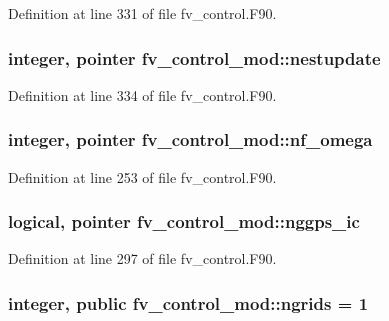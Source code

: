 Definition at line 331 of file fv\-\_\-control.\-F90.

\subsubsection[{nestupdate}]{\setlength{\rightskip}{0pt plus 5cm}integer, pointer fv\-\_\-control\-\_\-mod\-::nestupdate\hspace{0.3cm}{\ttfamily [private]}}\label{classfv__control__mod_aa2a2e8daf4ef4127a85ff187f6bdb44a}


Definition at line 334 of file fv\-\_\-control.\-F90.

\subsubsection[{nf\-\_\-omega}]{\setlength{\rightskip}{0pt plus 5cm}integer, pointer fv\-\_\-control\-\_\-mod\-::nf\-\_\-omega\hspace{0.3cm}{\ttfamily [private]}}\label{classfv__control__mod_af5caed647905a5044033d699efb9d678}


Definition at line 253 of file fv\-\_\-control.\-F90.

\subsubsection[{nggps\-\_\-ic}]{\setlength{\rightskip}{0pt plus 5cm}logical, pointer fv\-\_\-control\-\_\-mod\-::nggps\-\_\-ic\hspace{0.3cm}{\ttfamily [private]}}\label{classfv__control__mod_a6b8b8e887c41c9b275875bf1e24f17a4}


Definition at line 297 of file fv\-\_\-control.\-F90.

\subsubsection[{ngrids}]{\setlength{\rightskip}{0pt plus 5cm}integer, public fv\-\_\-control\-\_\-mod\-::ngrids = 1}\label{classfv__control__mod_abaa40fc70569bf400e1385f95bae1f5f}



